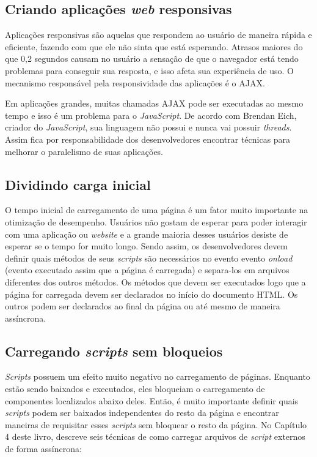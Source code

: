 \subsection{Criando aplicações \textit{web} responsivas}
\label{subsec:evenfaster_cap2}
Aplicações responsivas são aquelas que respondem ao usuário de maneira rápida e eficiente, fazendo com que ele não sinta que está esperando. Atrasos maiores do que 0,2 segundos causam no usuário a sensação de que o navegador está tendo problemas para conseguir sua resposta, e isso afeta sua experiência de uso. O mecanismo responsável pela responsividade das aplicações é o AJAX.

Em aplicações grandes, muitas chamadas AJAX pode ser executadas ao mesmo tempo e isso é um problema para o \textit{JavaScript}. De acordo com Brendan Eich, criador do \textit{JavaScript}, sua linguagem não possui e nunca vai possuir \textit{threads}. Assim fica por responsabilidade dos desenvolvedores encontrar técnicas para melhorar o paralelismo de suas aplicações.

\subsection{Dividindo carga inicial}
\label{subsec:evenfaster_cap3}
O tempo inicial de carregamento de uma página é um fator muito importante na otimização de desempenho. Usuários não gostam de esperar para poder interagir com uma aplicação ou \textit{website} e a grande maioria desses usuários desiste de esperar se o tempo for muito longo. Sendo assim, os desenvolvedores devem definir quais métodos de seus \textit{scripts} são necessários no evento evento \textit{onload} (evento executado assim que a página é carregada) e separa-los em arquivos diferentes dos outros métodos. Os métodos que devem ser executados logo que a página for carregada devem ser declarados no início do documento HTML. Os outros podem ser declarados ao final da página ou até mesmo de maneira assíncrona.

\subsection{Carregando \textit{scripts} sem bloqueios}
\label{subsec:evenfaster_cap4}
\textit{Scripts} possuem um efeito muito negativo no carregamento de páginas. Enquanto estão sendo baixados e executados, eles bloqueiam o carregamento de componentes localizados abaixo deles. Então, é muito importante definir quais \textit{scripts} podem ser baixados independentes do resto da página e encontrar maneiras de requisitar esses \textit{scripts} sem bloquear o resto da página. No Capítulo 4 deste livro,  descreve seis técnicas de como carregar arquivos de \textit{script} externos de forma assíncrona:


